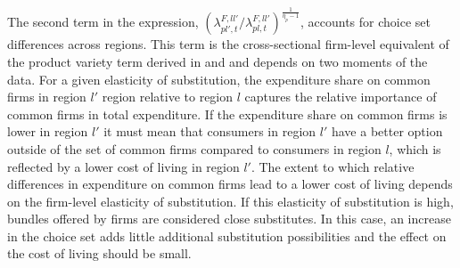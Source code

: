 The second term in the expression, $\left(\lambda^{F,ll'}_{pl',t}\bigg /\lambda^{F,ll'}_{pl,t}\right)^{\frac{1}{\eta_p-1}}$, accounts for choice set differences across regions. This term is the cross-sectional firm-level equivalent of the product variety term derived in \citet{Feenstra1994} and \citet{Broda2006} and depends on two moments of the data. For a given elasticity of substitution, the expenditure share on common firms in region $l'$ region relative to region $l$ captures the relative importance of common firms in total expenditure. If the expenditure share on common firms is lower in region $l'$ it must mean that consumers in region $l'$ have a better option outside of the set of common firms compared to consumers in region $l$, which is reflected by a lower cost of living in region $l'$. The extent to which relative differences in expenditure on common firms lead to a lower cost of living depends on the firm-level elasticity of substitution. If this elasticity of substitution is high, bundles offered by firms are considered close substitutes. In this case, an increase in the choice set adds little additional substitution possibilities and the effect on the cost of living should be small.

